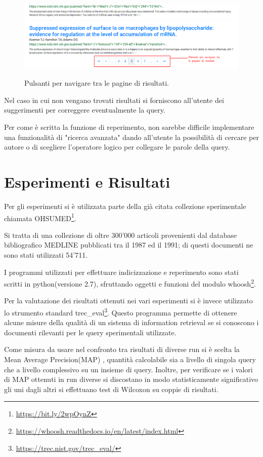 \documentclass[runningheads]{llncs}
\begin{document}
\begin{figure}%
    \centering
    {{\includegraphics[width=1\linewidth]{pagination} }}%
    \caption{Pulsanti per navigare tra le pagine di risultati.}%
\end{figure}

Nel caso in cui non vengano trovati risultati si forniscono all'utente dei
suggerimenti per correggere eventualmente la query.

Per come \`e scritta la funzione di reperimento, non sarebbe difficile
implementare una funzionalit\`a di "ricerca avanzata" dando all'utente la possibilit\`a 
di cercare per autore o di scegliere l'operatore logico per collegare le parole
della query.

\section{Esperimenti e Risultati}
\label{sec:esperimenti}


Per gli esperimenti si \`e utilizzata parte della gi\`a citata collezione sperimentale chiamata OHSUMED\footnote{ \url{https://bit.ly/2wpOynZ}}.

Si tratta di una collezione di oltre 300'000 articoli provenienti dal database bibliografico MEDLINE pubblicati tra il 1987 ed il 1991; di questi documenti ne sono stati utilizzati 54'711.

I programmi utilizzati per effettuare indicizzazione e reperimento sono stati scritti in python(versione 2.7), sfruttando oggetti e funzioni del modulo whoosh\footnote{ \url{https://whoosh.readthedocs.io/en/latest/index.html}}.

Per la valutazione dei risultati ottenuti nei vari esperimenti si \`e invece utilizzato lo strumento standard trec\_eval\footnote{ \url{https://trec.nist.gov/trec\_eval/}}.
Questo programma permette di ottenere alcune misure della qualit\`a di un sistema di information retrieval se si conoscono i documenti rilevanti per le query sperimentali utilizzate.

Come misura da usare nel confronto tra risultati di diverse run si \`e scelta la Mean Average Precision(MAP)\cite{WBC_map} , quantit\`a calcolabile sia a livello di singola query che a livello complessivo su un insieme di query.
Inoltre, per verificare se i valori di MAP ottenuti in run diverse si discostano in modo statisticamente significativo gli uni dagli altri si effettuano test di Wilcoxon\cite{} su coppie di risultati. \par
\end{document}
